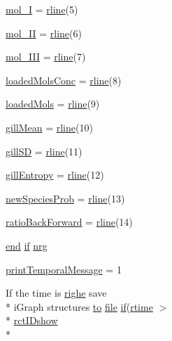 \begin{DoxyCompactItemize}
\hyperlink{a00028_aa34a234182765424bb00fc9fa273a9af}{mol\+\_\+\+I} = \hyperlink{a00028_ab5b947e1a8b7cf496ffd4eb21317052e}{rline}(5)
\item 
\hyperlink{a00028_a4f157720ec2d86dca3cf99f650dc5777}{mol\+\_\+\+I\+I} = \hyperlink{a00028_ab5b947e1a8b7cf496ffd4eb21317052e}{rline}(6)
\item 
\hyperlink{a00028_adf61c91ad9a34233b3fe493e21f8969e}{mol\+\_\+\+I\+I\+I} = \hyperlink{a00028_ab5b947e1a8b7cf496ffd4eb21317052e}{rline}(7)
\item 
\hyperlink{a00028_a96e1a3cfb8478cba3fec1e7a5839bb44}{loaded\+Mols\+Conc} = \hyperlink{a00028_ab5b947e1a8b7cf496ffd4eb21317052e}{rline}(8)
\item 
\hyperlink{a00028_a9ec42402ca3b08b7f3f2b602e1e2f3b0}{loaded\+Mols} = \hyperlink{a00028_ab5b947e1a8b7cf496ffd4eb21317052e}{rline}(9)
\item 
\hyperlink{a00028_a7d36858faf2f8bb5963306c86db2b549}{gill\+Mean} = \hyperlink{a00028_ab5b947e1a8b7cf496ffd4eb21317052e}{rline}(10)
\item 
\hyperlink{a00028_a187931f510c22818692d094c8026ebd1}{gill\+S\+D} = \hyperlink{a00028_ab5b947e1a8b7cf496ffd4eb21317052e}{rline}(11)
\item 
\hyperlink{a00028_aef2e92fdea881fe7819bf51b2d7e0783}{gill\+Entropy} = \hyperlink{a00028_ab5b947e1a8b7cf496ffd4eb21317052e}{rline}(12)
\item 
\hyperlink{a00028_aa66147edba72bc0b9cf591cd7475396f}{new\+Species\+Prob} = \hyperlink{a00028_ab5b947e1a8b7cf496ffd4eb21317052e}{rline}(13)
\item 
\hyperlink{a00028_a32ac1074f1b1cce044e95ec345f378e7}{ratio\+Back\+Forward} = \hyperlink{a00028_ab5b947e1a8b7cf496ffd4eb21317052e}{rline}(14)
\item 
\hyperlink{a00025_afb358f48b1646c750fb9da6c6585be2b}{end} \hyperlink{a00030_a01d55766b8058903dd360b4bda71f9f5}{if} \hyperlink{a00028_af837f695e5b67c86016c1a82608c38b4}{nrg}
\item 
\hyperlink{a00028_acc16e80f122cc11cf1570c53597afb19}{print\+Temporal\+Message} = 1
\item 
If the time is \hyperlink{a00108_abdf49e297e2c121f2d09f075ac3d518a}{righe} save \\*
i\+Graph structures \hyperlink{a00028_af71dbe52628a3f83a77ab494817525c6}{to} \hyperlink{a00110_a4e8353d6c62cf54bf4a1a8f63e56b8c3}{file} \hyperlink{a00030_a01d55766b8058903dd360b4bda71f9f5}{if}(\hyperlink{a00028_afc6b38657a313b9f1de2ee356910b6ee}{rtime} $>$\\*
 \hyperlink{a00028_acfa9ac92c0e448faa531767d0e6ab194}{rct\+I\+Dshow} \\*

\end{DoxyCompactItemize}

